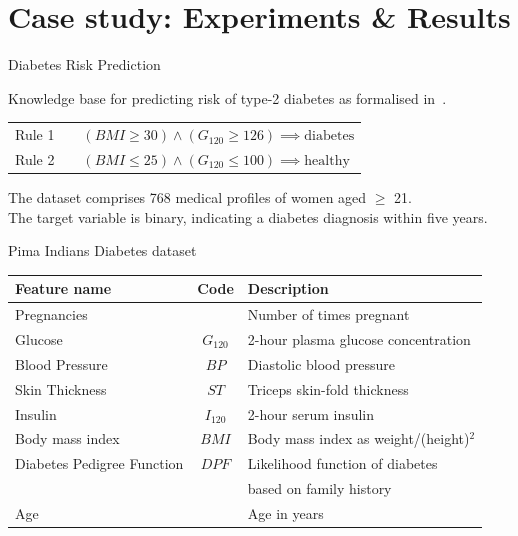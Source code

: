 \documentclass[presentation]{beamer} %
\begin{document}
\section[Case Study]{Case study: Experiments \& Results}
{
 \usebackgroundtemplate{}
 
\begin{frame}{Diabetes Risk Prediction}

\begin{block}{Knowledge base for predicting risk of type-2 diabetes as formalised in~\cite{kunapuli2010online}.}
\begin{table}[!h]

\label{tab:rules}
\begin{tabular}{|lll|}
\hline
Rule 1 & & $(BMI \geq 30) \land (G_{120} \geq 126) \implies \text{diabetes}$ \\
Rule 2 & & $(BMI \leq 25) \land (G_{120} \leq 100) \implies \text{healthy}$ \\
\hline
\end{tabular}
\end{table}
\end{block}

The dataset comprises 768 medical profiles of women aged $\geq$ 21. \\ The target variable is binary, indicating a diabetes diagnosis within five years. 


\begin{block}{Pima Indians Diabetes dataset}
\begin{table}[h]
\scriptsize{
\begin{tabular}{@{}lcl@{}}
\toprule
Feature name & Code & Description\\ 
\midrule
Pregnancies & & Number of times pregnant\\
Glucose & $G_{120}$ & 2-hour plasma glucose concentration \\
Blood Pressure & $BP$ & Diastolic blood pressure\\
Skin Thickness & $ST$ & Triceps skin-fold thickness\\
Insulin & $I_{120}$ & 2-hour serum insulin \\
Body mass index & $BMI$ & Body mass index as weight/(height)$^2$ \\
Diabetes Pedigree Function & $DPF$ & Likelihood function of diabetes \\
	 &  &  based on family history~\cite{smith1988using}\\
Age & & Age in years\\
\midrule
\end{tabular}
}


\end{table}
\end{block}
\end{frame}}
\end{document}
